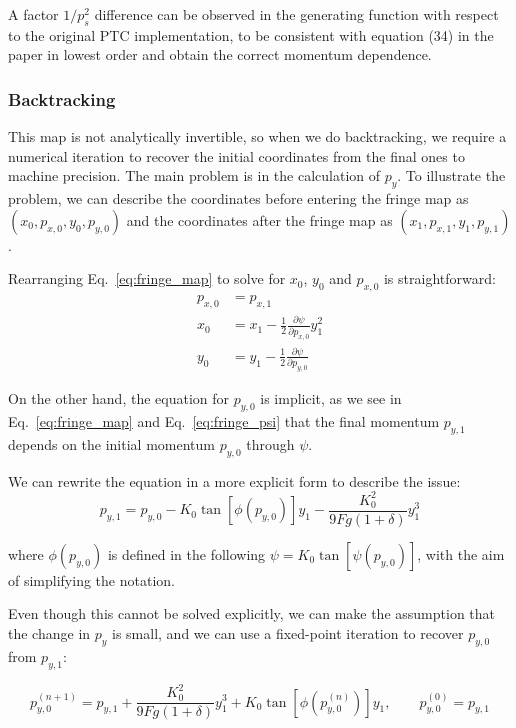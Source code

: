 A factor $1/p_s^2$ difference can be observed in the generating function with respect to the original PTC implementation, to be consistent with equation (34) in the paper in lowest order and obtain the correct momentum dependence.

\subsubsection{Backtracking}
This map is not analytically invertible, so when we do backtracking, we require
a numerical iteration to recover the initial coordinates from the final ones to machine precision.
The main problem is in the calculation of $p_y$. To illustrate the problem, we can describe
the coordinates before entering the fringe map as $(x_0, p_{x,0}, y_0, p_{y,0})$ and the
coordinates after the fringe map as $(x_1, p_{x,1}, y_1, p_{y,1})$.

Rearranging Eq.~\eqref{eq:fringe_map} to solve for $x_0$, $y_0$ and $p_{x,0}$ is straightforward:
\begin{equation}
\begin{aligned}
    p_{x,0} &= p_{x,1} \\
    x_0 &= x_1 - \frac{1}{2} \frac{\partial\psi}{\partial p_{x,0}} y_1^2 \\
    y_0 &= y_1 - \frac{1}{2}\frac{\partial\psi}{\partial p_{y,0}}
\end{aligned}
\end{equation}

On the other hand, the equation for $p_{y,0}$ is implicit, as we see in Eq.~\eqref{eq:fringe_map} and
Eq.~\eqref{eq:fringe_psi} that the final momentum $p_{y,1}$ depends on the initial momentum $p_{y,0}$ through $\psi$.

We can rewrite the equation in a more explicit form to describe the issue:
\begin{equation}
  p_{y,1} = p_{y,0} - K_0 \tan [\phi (p_{y,0})] y_1 - \frac{K_0^2}{9 F g (1 + \delta)} y_1^3
\end{equation}

where $\phi(p_{y,0})$ is defined in the following $\psi = K_0 \tan [\psi(p_{y,0})]$, with the aim of simplifying the notation.

Even though this cannot be solved explicitly, we can make the assumption that the change in $p_y$ is small,
and we can use a fixed-point iteration to recover $p_{y,0}$ from $p_{y,1}$:

\begin{equation}
p_{y,0}^{(n+1)}
=
p_{y,1}
+ \frac{K_0^2}{9 F g (1 + \delta)} y_1^3
+ K_0 \tan\left[\phi\left(p_{y,0}^{(n)}\right)\right] y_1,
\qquad
p_{y,0}^{(0)} = p_{y,1}
\end{equation}

